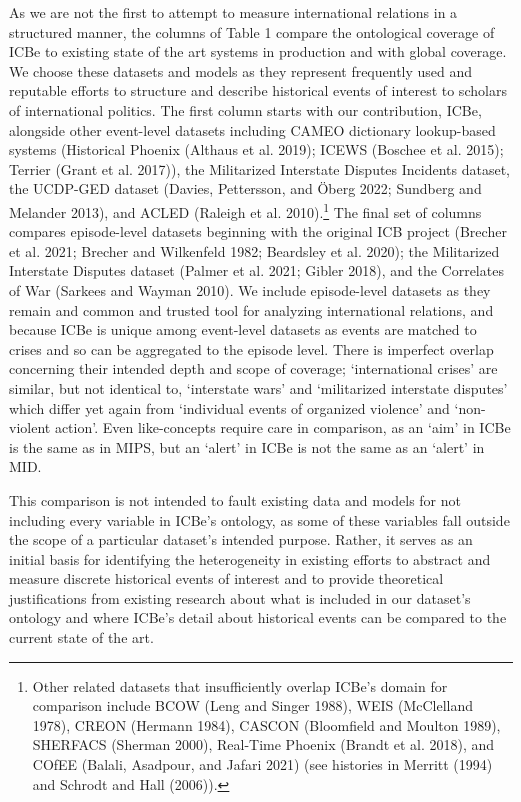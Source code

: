 \documentclass{article}
\begin{document}
As we are not the first to attempt to measure international relations in
a structured manner, the columns of Table 1 compare the ontological
coverage of ICBe to existing state of the art systems in production and
with global coverage. We choose these datasets and models as they
represent frequently used and reputable efforts to structure and
describe historical events of interest to scholars of international
politics. The first column starts with our contribution, ICBe, alongside
other event-level datasets including CAMEO dictionary lookup-based
systems (Historical Phoenix (Althaus et al. 2019); ICEWS (Boschee et al.
2015); Terrier (Grant et al. 2017)), the Militarized Interstate Disputes
Incidents dataset, the UCDP-GED dataset (Davies, Pettersson, and Öberg
2022; Sundberg and Melander 2013), and ACLED (Raleigh et al.
2010).\footnote{Other related datasets that insufficiently overlap
  ICBe's domain for comparison include BCOW (Leng and Singer 1988), WEIS
  (McClelland 1978), CREON (Hermann 1984), CASCON (Bloomfield and
  Moulton 1989), SHERFACS (Sherman 2000), Real-Time Phoenix (Brandt et
  al. 2018), and COfEE (Balali, Asadpour, and Jafari 2021) (see
  histories in Merritt (1994) and Schrodt and Hall (2006)).} The final
set of columns compares episode-level datasets beginning with the
original ICB project (Brecher et al. 2021; Brecher and Wilkenfeld 1982;
Beardsley et al. 2020); the Militarized Interstate Disputes dataset
(Palmer et al. 2021; Gibler 2018), and the Correlates of War (Sarkees
and Wayman 2010). We include episode-level datasets as they remain and
common and trusted tool for analyzing international relations, and
because ICBe is unique among event-level datasets as events are matched
to crises and so can be aggregated to the episode level. There is
imperfect overlap concerning their intended depth and scope of coverage;
`international crises' are similar, but not identical to, `interstate
wars' and `militarized interstate disputes' which differ yet again from
`individual events of organized violence' and `non-violent action'. Even
like-concepts require care in comparison, as an `aim' in ICBe is the
same as in MIPS, but an `alert' in ICBe is not the same as an `alert' in
MID.

This comparison is not intended to fault existing data and models for
not including every variable in ICBe's ontology, as some of these
variables fall outside the scope of a particular dataset's intended
purpose. Rather, it serves as an initial basis for identifying the
heterogeneity in existing efforts to abstract and measure discrete
historical events of interest and to provide theoretical justifications
from existing research about what is included in our dataset's ontology
and where ICBe's detail about historical events can be compared to the
current state of the art.
\end{document}
